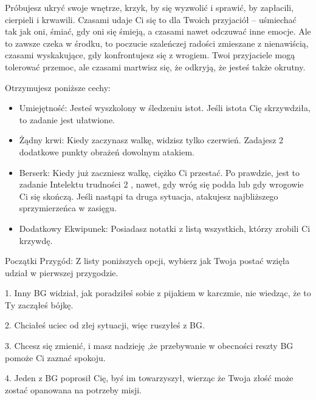 Próbujesz ukryć swoje wnętrze, krzyk, by się wyzwolić i sprawić, by zapłacili, cierpieli i krwawili. Czasami udaje Ci się to dla Twoich przyjaciół – uśmiechać tak jak oni, śmiać, gdy oni się śmieją, a czasami nawet odczuwać inne emocje. Ale to zawsze czeka w środku, to poczucie szaleńczej radości zmieszane z nienawiścią, czasami wyskakujące, gdy konfrontujesz się z wrogiem. Twoi przyjaciele mogą tolerować przemoc, ale czasami martwisz się, że odkryją, że jesteś także okrutny.

Otrzymujesz poniższe cechy:
\begin{itemize}
    \item Umiejętność: Jesteś wyszkolony w śledzeniu istot. Jeśli istota Cię skrzywdziła, to zadanie jest ułatwione.
    \item  Żądny krwi: Kiedy zaczynasz walkę, widzisz tylko czerwień. Zadajesz 2 dodatkowe punkty obrażeń dowolnym atakiem. 
    \item  Berserk: Kiedy już zaczniesz walkę, ciężko Ci przestać. Po prawdzie, jest to zadanie Intelektu trudności 2 , nawet, gdy wróg się podda lub gdy wrogowie Ci się skończą. Jeśli nastąpi ta druga sytuacja, atakujesz najbliższego sprzymierzeńca w zasięgu.
    \item  Dodatkowy Ekwipunek: Posiadasz notatki z listą wszystkich, którzy zrobili Ci krzywdę.
\end{itemize}

Początki Przygód: Z listy poniższych opcji, wybierz jak Twoja postać wzięła udział w pierwszej przygodzie.

1. Inny BG widział, jak poradziłeś sobie z pijakiem w karczmie, nie wiedząc, że to Ty zacząłeś bójkę.

2. Chciałeś uciec od złej sytuacji, więc ruszyłeś z BG.

3. Chcesz się zmienić, i masz nadzieję ,że przebywanie w obecności reszty BG pomoże Ci zaznać spokoju.

4. Jeden z BG poprosił Cię, byś im towarzyszył, wierząc że Twoja złość może zostać opanowana na potrzeby misji.